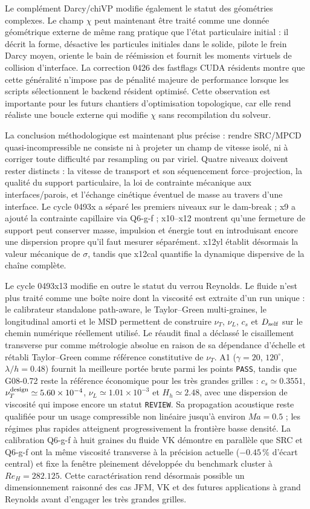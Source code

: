 \documentclass[11pt,a4paper]{article}
\begin{document}
Le complément Darcy/chiVP modifie également le statut des géométries complexes. Le champ $\chi$ peut maintenant être traité comme une donnée géométrique externe de même rang pratique que l'état particulaire initial : il décrit la forme, désactive les particules initiales dans le solide, pilote le frein Darcy moyen, oriente le bain de réémission et fournit les moments virtuels de collision d'interface. La correction 0426 des fastflags CUDA résidents montre que cette généralité n'impose pas de pénalité majeure de performance lorsque les scripts sélectionnent le backend résident optimisé. Cette observation est importante pour les futurs chantiers d'optimisation topologique, car elle rend réaliste une boucle externe qui modifie $\chi$ sans recompilation du solveur.

La conclusion méthodologique est maintenant plus précise : rendre SRC/MPCD quasi-incompressible ne consiste ni à projeter un champ de vitesse isolé, ni à corriger toute difficulté par resampling ou par viriel. Quatre niveaux doivent rester distincts : la vitesse de transport et son séquencement force--projection, la qualité du support particulaire, la loi de contrainte mécanique aux interfaces/parois, et l'échange cinétique éventuel de masse au travers d'une interface. Le cycle 0493x a séparé les premiers niveaux sur le dam-break ; x9 a ajouté la contrainte capillaire via Q6-g-f ; x10--x12 montrent qu'une fermeture de support peut conserver masse, impulsion et énergie tout en introduisant encore une dispersion propre qu'il faut mesurer séparément. x12yl établit désormais la valeur mécanique de $\sigma$, tandis que x12cal quantifie la dynamique dispersive de la chaîne complète.

Le cycle 0493x13 modifie en outre le statut du verrou Reynolds. Le fluide n'est plus traité comme une boîte noire dont la viscosité est extraite d'un run unique : le calibrateur standalone path-aware, le Taylor--Green multi-graines, le longitudinal amorti et le MSD permettent de construire $\nu_T$, $\nu_L$, $c_s$ et $D_{\rm self}$ sur le chemin numérique réellement utilisé. Le réaudit final a déclassé le cisaillement transverse pur comme métrologie absolue en raison de sa dépendance d'échelle et rétabli Taylor--Green comme référence constitutive de $\nu_T$. A1 ($\gamma=20$, $120^\circ$, $\lambda/h=0.48$) fournit la meilleure portée brute parmi les points \texttt{PASS}, tandis que G08-0.72 reste la référence économique pour les très grandes grilles : $c_s\simeq0.3551$, $\nu_T^{\rm design}\simeq5.60\times10^{-4}$, $\nu_L\simeq1.01\times10^{-3}$ et $H_h\simeq2.48$, avec une dispersion de viscosité qui impose encore un statut \texttt{REVIEW}. Sa propagation acoustique reste qualifiée pour un usage compressible non linéaire jusqu'à environ $Ma=0.5$ ; les régimes plus rapides atteignent progressivement la frontière basse densité. La calibration Q6-g-f à huit graines du fluide VK démontre en parallèle que SRC et Q6-g-f ont la même viscosité transverse à la précision actuelle ($-0.45\,\%$ d'écart central) et fixe la fenêtre pleinement développée du benchmark cluster à $Re_H=282.125$. Cette caractérisation rend désormais possible un dimensionnement raisonné des cas JFM, VK et des futures applications à grand Reynolds avant d'engager les très grandes grilles.
\end{document}
